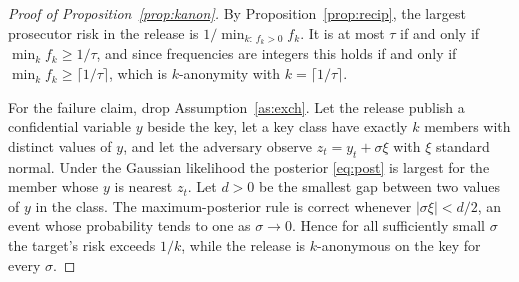 \begin{proof}[Proof of Proposition~\ref{prop:kanon}]
By Proposition~\ref{prop:recip}, the largest prosecutor risk in the release is
$1/\min_{k:\,f_k>0} f_k$. It is at most $\tau$ if and only if
$\min_k f_k \ge 1/\tau$, and since frequencies are integers this holds if and only
if $\min_k f_k \ge \lceil 1/\tau \rceil$, which is $k$-anonymity with
$k = \lceil 1/\tau \rceil$.

For the failure claim, drop Assumption~\ref{as:exch}. Let the release publish a
confidential variable $y$ beside the key, let a key class have exactly $k$ members
with distinct values of $y$, and let the adversary observe
$z_t = y_t + \sigma\xi$ with $\xi$ standard normal. Under the Gaussian likelihood
the posterior \eqref{eq:post} is largest for the member whose $y$ is nearest $z_t$.
Let $d > 0$ be the smallest gap between two values of $y$ in the class. The
maximum-posterior rule is correct whenever $|\sigma\xi| < d/2$, an event whose
probability tends to one as $\sigma \to 0$. Hence for all sufficiently small
$\sigma$ the target's risk exceeds $1/k$, while the release is $k$-anonymous on the
key for every $\sigma$.
\end{proof}
